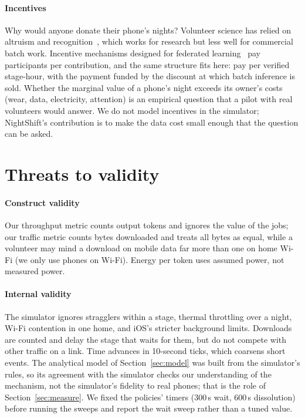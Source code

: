 \documentclass[preprint,review,12pt,authoryear]{elsarticle}
\begin{document}
\paragraph{Incentives} Why would anyone donate their phone's nights? Volunteer
science has relied on altruism and recognition~\citep{anderson2006}, which
works for research but less well for commercial batch work. Incentive
mechanisms designed for federated learning~\citep{zhan2021incentive} pay
participants per contribution, and the same structure fits here: pay per
verified stage-hour, with the payment funded by the discount at which batch
inference is sold. Whether the marginal value of a phone's night exceeds its
owner's costs (wear, data, electricity, attention) is an empirical question
that a pilot with real volunteers would answer. We do not model incentives in
the simulator; NightShift's contribution is to make the data cost small enough
that the question can be asked.

\section{Threats to validity}
\label{sec:threats}

\paragraph{Construct validity} Our throughput metric counts output tokens and
ignores the value of the jobs; our traffic metric counts bytes downloaded and
treats all bytes as equal, while a volunteer may mind a download on mobile
data far more than one on home Wi-Fi (we only use phones on Wi-Fi).
Energy per token uses assumed power, not measured power.

\paragraph{Internal validity} The simulator ignores stragglers within a stage,
thermal throttling over a night, Wi-Fi contention in one home, and iOS's
stricter background limits. Downloads are counted and delay the stage that
waits for them, but do not compete with other traffic on a link. Time advances
in 10-second ticks, which coarsens short events. The analytical model of
Section~\ref{sec:model} was built from the simulator's rules, so its agreement
with the simulator checks our understanding of the mechanism, not the
simulator's fidelity to real phones; that is the role of
Section~\ref{sec:measure}. We fixed the policies' timers (300\,s wait, 600\,s
dissolution) before running the sweeps and report the wait sweep rather than
a tuned value.
\end{document}
